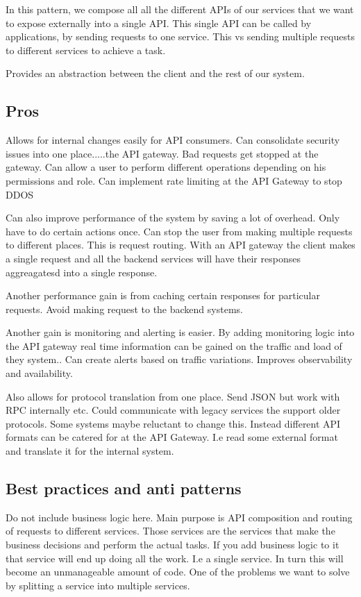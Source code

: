 \documentclass[a4paper, 11pt]{book}
\begin{document}
    In this pattern, we compose all all the different APIs of our services that we want to expose externally into a single API.
    This single API can be called by applications, by sending requests to one service.
    This vs sending multiple requests to different services to achieve a task.

    Provides an abstraction between the client and the rest of our system.

    \subsection{Pros}
    Allows for internal changes easily for API consumers.
    Can consolidate security issues into one place.....the API gateway.
    Bad requests get stopped at the gateway.
    Can allow a user to perform different operations depending on his permissions and role.
    Can implement rate limiting at the API Gateway to stop DDOS

    Can also improve performance of the system by saving a lot of overhead.
    Only have to do certain actions once.
    Can stop the user from making multiple requests to different places.
    This is request routing.
    With an API gateway the client makes a single request and all the backend services will have their responses aggreagatesd into a single response.

    Another performance gain is from caching certain responses for particular requests.
    Avoid making request to the backend systems.

    Another gain is monitoring and alerting is easier.
    By adding monitoring logic into the API gateway real time information can be gained on the traffic and load of they system..
    Can create alerts based on traffic variations.
    Improves observability and availability.

    Also allows for protocol translation from one place.
    Send JSON but work with RPC internally etc.
    Could communicate with legacy services the support older protocols.
    Some systems maybe reluctant to change this.
    Instead different API formats can be catered for at the API Gateway.
    I.e read some external format and translate it for the internal system.

    \subsection{Best practices and anti patterns}
    Do not include business logic here.
    Main purpose is API composition and routing of requests to different services.
    Those services are the services that make the business decisions and perform the actual tasks.
    If you add business logic to it that service will end up doing all the work.
    I.e a single service.
    In turn this will become an unmanageable amount of code.
    One of the problems we want to solve by splitting a service into multiple services.
\end{document}
